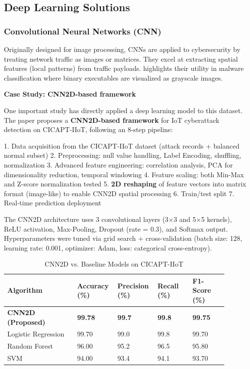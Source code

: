 \subsection{Deep Learning Solutions}

\subsubsection{Convolutional Neural Networks (CNN)}
Originally designed for image processing, CNNs are applied to cybersecurity by treating network traffic as images or matrices. They excel at extracting spatial features (local patterns) from traffic payloads. \cite{ankalaki2025cyber} highlights their utility in malware classification where binary executables are visualized as grayscale images.

\textbf{Case Study: CNN2D-based framework \cite{SharmilaD2026CNN2D}}

One important study \cite{SharmilaD2026CNN2D} has directly applied a deep learning model to this dataset. The paper proposes a \textbf{CNN2D-based framework} for IoT cyberattack detection on CICAPT-IIoT, following an 8-step pipeline:

1. Data acquisition from the CICAPT-IIoT dataset (attack records + balanced normal subset)
2. Preprocessing: null value handling, Label Encoding, shuffling, normalization
3. Advanced feature engineering: correlation analysis, PCA for dimensionality reduction, temporal windowing
4. Feature scaling: both Min-Max and Z-score normalization tested
5. \textbf{2D reshaping} of feature vectors into matrix format (image-like) to enable CNN2D spatial processing
6. Train/test split
7. Real-time prediction deployment

The CNN2D architecture uses 3 convolutional layers (3$\times$3 and 5$\times$5 kernels), ReLU activation, Max-Pooling, Dropout (rate = 0.3), and Softmax output. Hyperparameters were tuned via grid search + cross-validation (batch size: 128, learning rate: 0.001, optimizer: Adam, loss: categorical cross-entropy).


\begin{table}[H]
\centering
\caption{CNN2D vs. Baseline Models on CICAPT-IIoT \protect \cite{ghiasvand2024cicapt}}
\medskip
\begin{tabular}{|p{0.3\linewidth}|p{0.15\linewidth}|p{0.15\linewidth}|p{0.15\linewidth}|p{0.15\linewidth}|}
\hline
\textbf{Algorithm} & \textbf{Accuracy (\%)} & \textbf{Precision (\%)} & \textbf{Recall (\%)} & \textbf{F1-Score (\%)} \\
\hline
\textbf{CNN2D (Proposed)} & \textbf{99.78} & \textbf{99.7} & \textbf{99.8} & \textbf{99.75} \\
\hline
Logistic Regression & 99.70 & 99.0 & 99.8 & 99.70 \\
\hline
Random Forest & 96.00 & 95.2 & 96.5 & 95.80 \\
\hline
SVM & 94.00 & 93.4 & 94.1 & 93.70 \\
\hline
\end{tabular}
\label{tab:cnn2d_results}
\end{table}

